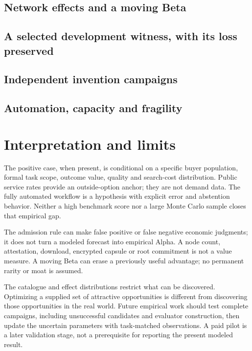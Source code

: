 \documentclass[11pt,a4paper]{article}
\begin{document}
\subsection{Network effects and a moving Beta}
\ResultNetwork

\ResultNetworkFigure
\ResultMovingBeta

\ResultMovingBetaFigure

\subsection{A selected development witness, with its loss preserved}
\ResultWitness

\subsection{Independent invention campaigns}
\ResultCampaigns

\ResultCampaignFigure

\subsection{Automation, capacity and fragility}
\ResultAutomation
\ResultFragility

\ResultSensitivityFigure

\section{Interpretation and limits}

\ResultConclusion

The positive case, when present, is conditional on a specific buyer population, formal task scope, outcome value, quality and search-cost distribution. Public service rates provide an outside-option anchor; they are not demand data. The fully automated workflow is a hypothesis with explicit error and abstention behavior. Neither a high benchmark score nor a large Monte Carlo sample closes that empirical gap.

The admission rule can make false positive or false negative economic judgments; it does not turn a modeled forecast into empirical Alpha. A node count, attestation, download, encrypted capsule or root commitment is not a value measure. A moving Beta can erase a previously useful advantage; no permanent rarity or moat is assumed.

The catalogue and effect distributions restrict what can be discovered. Optimizing a supplied set of attractive opportunities is different from discovering those opportunities in the real world. Future empirical work should test complete campaigns, including unsuccessful candidates and evaluator construction, then update the uncertain parameters with task-matched observations. A paid pilot is a later validation stage, not a prerequisite for reporting the present modeled result.
\end{document}
